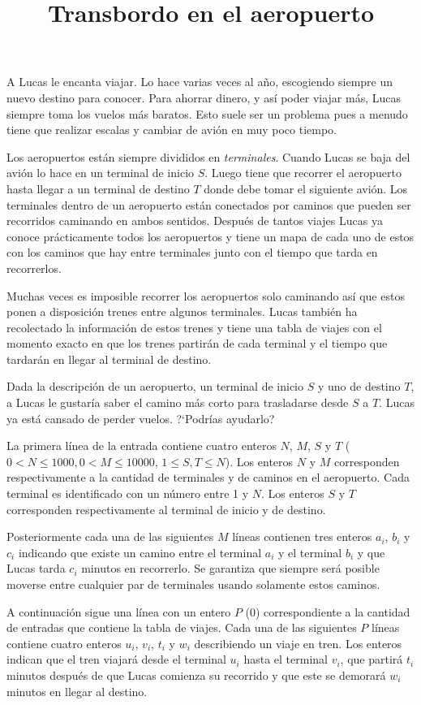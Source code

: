 \documentclass{oci}
\title{Transbordo en el aeropuerto}
\begin{document}
\begin{problemDescription}
  A Lucas le encanta viajar.
  Lo hace varias veces al año, escogiendo siempre un nuevo destino para conocer.
  Para ahorrar dinero, y así poder viajar más, Lucas siempre toma los vuelos más
  baratos.
  Esto suele ser un problema pues a menudo tiene que realizar escalas y cambiar
  de avión en muy poco tiempo.

  Los aeropuertos están siempre divididos en \emph{terminales}.
  Cuando Lucas se baja del avión lo hace en un terminal de inicio $S$.
  Luego tiene que recorrer el aeropuerto hasta llegar a un terminal de destino
  $T$ donde debe tomar el siguiente avión.
  Los terminales dentro de un aeropuerto están conectados por caminos que pueden
  ser recorridos caminando en ambos sentidos.
  Después de tantos viajes Lucas ya conoce prácticamente todos los aeropuertos
  y tiene un mapa de cada uno de estos con los caminos que hay entre terminales
  junto con el tiempo que tarda en recorrerlos.

  Muchas veces es imposible recorrer los aeropuertos solo caminando así que
  estos ponen a disposición trenes entre algunos terminales.
  Lucas también ha recolectado la información de estos trenes y tiene una tabla
  de viajes con el momento exacto en que los trenes partirán de cada terminal y
  el tiempo que tardarán en llegar al terminal de destino.

  Dada la descripción de un aeropuerto, un terminal de inicio $S$ y uno de
  destino $T$, a Lucas le gustaría saber el camino más corto para trasladarse
  desde $S$ a $T$.
  Lucas ya está cansado de perder vuelos.
  ?`Podrías ayudarlo?
\end{problemDescription}

\begin{inputDescription}
  La primera línea de la entrada contiene cuatro enteros $N$, $M$, $S$ y $T$
  ($0 < N\leq 1000, 0 < M \leq 10000$, $1 \leq S, T\leq N$).
  Los enteros $N$ y $M$ corresponden respectivamente a la cantidad de terminales
  y de caminos en el aeropuerto.
  Cada terminal es identificado con un número entre 1 y $N$.
  Los enteros $S$ y $T$ corresponden respectivamente al terminal de inicio y de
  destino.

  Posteriormente cada una de las siguientes $M$ líneas contienen tres enteros
  $a_i$, $b_i$ y $c_i$ indicando que existe un camino entre el terminal $a_i$ y
  el terminal $b_i$ y que Lucas tarda $c_i$ minutos en recorrerlo.
  Se garantiza que siempre será posible moverse entre cualquier par de
  terminales usando solamente estos caminos.

  A continuación sigue una línea con un entero $P$ ($0$) correspondiente a la
  cantidad de entradas que contiene la tabla de viajes.
  Cada una de las siguientes $P$ líneas contiene cuatro enteros $u_i$, $v_i$,
  $t_i$ y $w_i$ describiendo un viaje en tren.
  Los enteros indican que el tren viajará desde el terminal $u_i$ hasta el
  terminal $v_i$, que partirá $t_i$ minutos después de que Lucas comienza su
  recorrido y que este se demorará $w_i$ minutos en llegar al destino.
\end{inputDescription}
\end{document}
